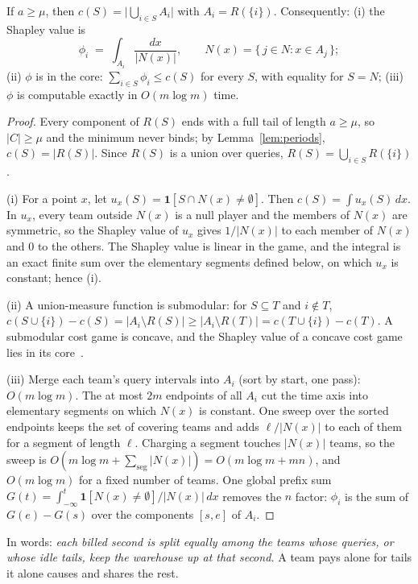 \documentclass[sigconf]{acmart}
\begin{document}
\begin{theorem}\label{thm:coverage}
If $a \ge \mu$, then $c(S) = \bigl|\bigcup_{i \in S} A_i\bigr|$ with $A_i = R(\{i\})$. Consequently:
(i) the Shapley value is
\[\phi_i \;=\; \int_{A_i} \frac{dx}{|N(x)|}, \qquad N(x) = \{\, j \in N : x \in A_j \,\};\]
(ii) $\phi$ is in the core: $\sum_{i \in S} \phi_i \le c(S)$ for every $S$, with equality for $S = N$;
(iii) $\phi$ is computable exactly in $O(m \log m)$ time.
\end{theorem}
\begin{proof}
Every component of $R(S)$ ends with a full tail of length $a \ge \mu$, so $|C| \ge \mu$ and the minimum never binds;
by Lemma~\ref{lem:periods}, $c(S) = |R(S)|$. Since $R(S)$ is a union over queries, $R(S) = \bigcup_{i\in S} R(\{i\})$.

(i) For a point $x$, let $u_x(S) = \mathbf{1}[S \cap N(x) \neq \emptyset]$. Then $c(S) = \int u_x(S)\,dx$. In $u_x$, every
team outside $N(x)$ is a null player and the members of $N(x)$ are symmetric, so the Shapley value of $u_x$ gives
$1/|N(x)|$ to each member of $N(x)$ and $0$ to the others. The Shapley value is linear in the game, and the integral is an
exact finite sum over the elementary segments defined below, on which $u_x$ is constant; hence (i).

(ii) A union-measure function is submodular: for $S \subseteq T$ and $i \notin T$,
$c(S \cup \{i\}) - c(S) = |A_i \setminus R(S)| \ge |A_i \setminus R(T)| = c(T \cup \{i\}) - c(T)$. A submodular cost game
is concave, and the Shapley value of a concave cost game lies in its core~\cite{shapley71}.

(iii) Merge each team's query intervals into $A_i$ (sort by start, one pass): $O(m \log m)$. The at most $2m$ endpoints of
all $A_i$ cut the time axis into elementary segments on which $N(x)$ is constant. One sweep over the sorted endpoints keeps
the set of covering teams and adds $\ell/|N(x)|$ to each of them for a segment of length $\ell$. Charging a segment touches
$|N(x)|$ teams, so the sweep is $O(m\log m + \sum_{\text{seg}} |N(x)|) = O(m \log m + mn)$, and $O(m \log m)$ for a fixed
number of teams. One global prefix sum $G(t) = \int_{-\infty}^{t} \mathbf{1}[N(x)\neq\emptyset]/|N(x)|\,dx$ removes the $n$
factor: $\phi_i$ is the sum of $G(e) - G(s)$ over the components $[s, e]$ of $A_i$.
\end{proof}

In words: \emph{each billed second is split equally among the teams whose queries, or whose idle tails, keep the warehouse
up at that second.} A team pays alone for tails it alone causes and shares the rest.
\end{document}
